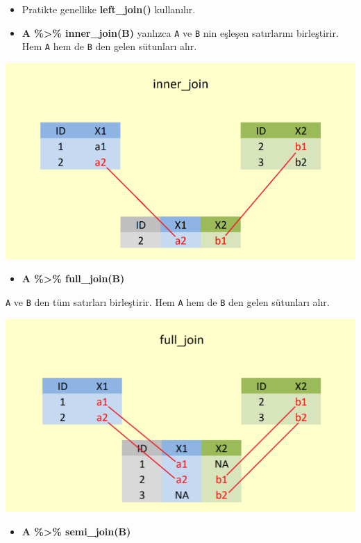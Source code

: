 \documentclass[
  oneside]{book}
\providecommand{\tightlist}{%
  \setlength{\itemsep}{0pt}\setlength{\parskip}{0pt}}
\begin{document}
\begin{itemize}
\item
  Pratikte genellike \textbf{left\_join()} kullanılır.
\item
  \textbf{A \%\textgreater\% inner\_join(B)}
  yanlızca \texttt{A} ve \texttt{B} nin eşleşen satırlarını birleştirir. Hem \texttt{A} hem de \texttt{B} den gelen sütunları alır.
\end{itemize}

\begin{center}\includegraphics[width=0.75\linewidth]{images/inner_join} \end{center}

\begin{itemize}
\tightlist
\item
  \textbf{A \%\textgreater\% full\_join(B)}
\end{itemize}

\texttt{A} ve \texttt{B} den tüm satırları birleştirir. Hem \texttt{A} hem de \texttt{B} den gelen sütunları alır.

\begin{center}\includegraphics[width=0.75\linewidth]{images/full_join} \end{center}

\begin{itemize}
\tightlist
\item
  \textbf{A \%\textgreater\% semi\_join(B)}
\end{itemize}
\end{document}

